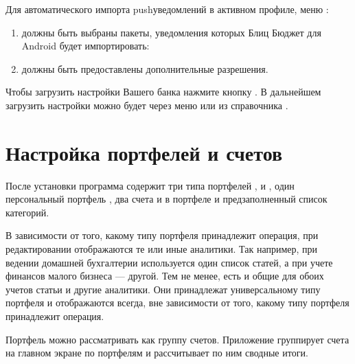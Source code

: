 \documentclass[a4paper,10pt,russian]{sphinxmanual}
\begin{document}
\sphinxAtStartPar
Для автоматического импорта push\sphinxhyphen{}уведомлений в активном профиле, меню :
\begin{enumerate}
%
\item {} 
\sphinxAtStartPar
должны быть выбраны пакеты, уведомления которых Блиц Бюджет для Android будет импортировать:

\item {} 
\sphinxAtStartPar
должны быть предоставлены дополнительные разрешения.

\end{enumerate}

\sphinxAtStartPar
Чтобы загрузить настройки Вашего банка нажмите кнопку . В дальнейшем загрузить
настройки можно будет через меню  или из справочника
.

\noindent{}
\noindent{}


\section{Настройка портфелей и счетов}
\label{\detokenize{getting-started:id4}}
\sphinxAtStartPar
После установки программа содержит три типа портфелей ,  и ,
один персональный портфель , два счета  и  в портфеле  и предзаполненный
список категорий.

\sphinxAtStartPar
В зависимости от того, какому типу портфеля принадлежит операция, при редактировании отображаются те или иные аналитики.  Так например,
при ведении домашней бухгалтерии используется один список статей, а при учете финансов малого бизнеса — другой.
Тем не менее, есть и общие для обоих учетов статьи и другие аналитики. Они принадлежат универсальному типу портфеля и
отображаются всегда, вне зависимости от того, какому типу портфеля принадлежит операция.

\sphinxAtStartPar
Портфель можно рассматривать как группу счетов. Приложение группирует счета на главном экране по портфелям и рассчитывает
по ним сводные итоги.
\end{document}
